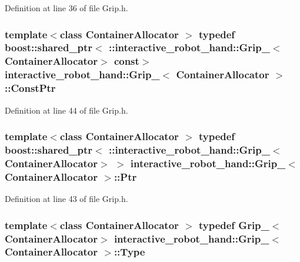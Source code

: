 Definition at line 36 of file Grip.\-h.

\subsubsection[{Const\-Ptr}]{\setlength{\rightskip}{0pt plus 5cm}template$<$class Container\-Allocator $>$ typedef boost\-::shared\-\_\-ptr$<$ \-::{\bf interactive\-\_\-robot\-\_\-hand\-::\-Grip\-\_\-}$<$Container\-Allocator$>$ const$>$ {\bf interactive\-\_\-robot\-\_\-hand\-::\-Grip\-\_\-}$<$ Container\-Allocator $>$\-::{\bf Const\-Ptr}}\label{structinteractive__robot__hand_1_1Grip___abb257d311d0afdefa019d4b54270fbf4}


Definition at line 44 of file Grip.\-h.

\subsubsection[{Ptr}]{\setlength{\rightskip}{0pt plus 5cm}template$<$class Container\-Allocator $>$ typedef boost\-::shared\-\_\-ptr$<$ \-::{\bf interactive\-\_\-robot\-\_\-hand\-::\-Grip\-\_\-}$<$Container\-Allocator$>$ $>$ {\bf interactive\-\_\-robot\-\_\-hand\-::\-Grip\-\_\-}$<$ Container\-Allocator $>$\-::{\bf Ptr}}\label{structinteractive__robot__hand_1_1Grip___afd59e84f5607361cb3649e93ccd03d8c}


Definition at line 43 of file Grip.\-h.

\subsubsection[{Type}]{\setlength{\rightskip}{0pt plus 5cm}template$<$class Container\-Allocator $>$ typedef {\bf Grip\-\_\-}$<$Container\-Allocator$>$ {\bf interactive\-\_\-robot\-\_\-hand\-::\-Grip\-\_\-}$<$ Container\-Allocator $>$\-::{\bf Type}}\label{structinteractive__robot__hand_1_1Grip___a624ecc07985ab5bc6fd97b0ceff5a0ae}


